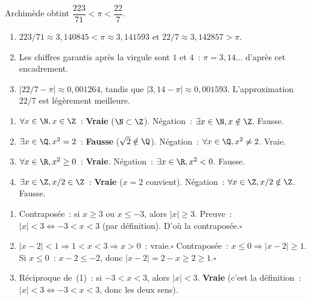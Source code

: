 
Archim\`ede obtint $\dfrac{223}{71}<\pi<\dfrac{22}{7}$.

\begin{enumerate}
  \item $223/71\approx3{,}140845<\pi\approx3{,}141593$
        et $22/7\approx3{,}142857>\pi$.
  \item Les chiffres garantis apr\`es la virgule sont $1$ et $4$~:
        $\pi=3{,}14\ldots$ d'apr\`es cet encadrement.
  \item $|22/7-\pi|\approx0{,}001264$, tandis que
        $|3{,}14-\pi|\approx0{,}001593$.
        L'approximation $22/7$ est l\'eg\`erement meilleure.
\end{enumerate}


\begin{enumerate}
  \item $\forall x\in\N, x\in\Z$~: \textbf{Vraie} ($\N\subset\Z$).
        N\'egation~: $\exists x\in\N, x\notin\Z$. Fausse.
  \item $\exists x\in\Q, x^2=2$~: \textbf{Fausse} ($\sqrt{2}\notin\Q$).
        N\'egation~: $\forall x\in\Q, x^2\ne2$. Vraie.
  \item $\forall x\in\R, x^2\geq0$~: \textbf{Vraie}.
        N\'egation~: $\exists x\in\R, x^2<0$. Fausse.
  \item $\exists x\in\Z, x/2\in\Z$~: \textbf{Vraie} ($x=2$ convient).
        N\'egation~: $\forall x\in\Z, x/2\notin\Z$. Fausse.
\end{enumerate}


\begin{enumerate}
  \item Contrapos\'ee~: si $x\geq3$ ou $x\leq-3$, alors $|x|\geq3$.
        Preuve~: $|x|<3\Leftrightarrow-3<x<3$ (par d\'efinition). D'o\`u la contrapos\'ee.\hfill$\square$
  \item $|x-2|<1\Rightarrow1<x<3\Rightarrow x>0$~: vraie.\hfill$\square$
        Contrapos\'ee~: $x\leq0\Rightarrow|x-2|\geq1$.
        Si $x\leq0$~: $x-2\leq-2$, donc $|x-2|=2-x\geq2\geq1$.\hfill$\square$
  \item R\'eciproque de~(1)~: si $-3<x<3$, alors $|x|<3$. \textbf{Vraie}
        (c'est la d\'efinition~: $|x|<3\Leftrightarrow-3<x<3$, donc les deux sens).
\end{enumerate}

